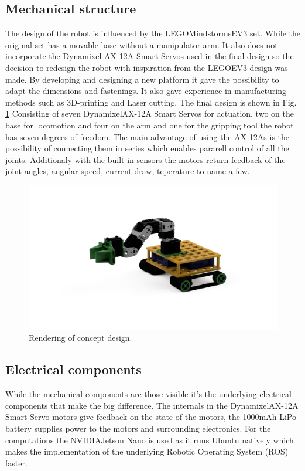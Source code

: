 
\subsection{Mechanical structure}
The design of the robot is influenced by the LEGO\textregistered Mindstorms\textregistered EV3 set. While the original set has a movable base without a manipulator arm. It also does not incorporate the Dynamixel AX-12A Smart Servos used in the final design so the decision to redesign the robot with inspiration from the LEGO\textregistered EV3 design was made. By developing and designing a new platform it gave the possibility to adapt the dimensions and fastenings. It also gave experience in manufacturing methods such as 3D-printing and Laser cutting. The final design is shown in Fig. \ref{fig:concept_rendering}
Consisting of seven Dynamixel\textregistered AX-12A Smart Servos for actuation, two on the base for locomotion and four on the arm and one for the gripping tool the robot has seven degrees of freedom. The main advantage of using the AX-12As is the possibility of connecting them in series which enables pararell control of all the joints. Additionaly with the built in sensors the motors return feedback of the joint angles, angular speed, current draw, teperature to name a few.  

\begin{figure}
    \centering
    \includegraphics[width=0.7\columnwidth]{chapters/img/rendering.png}
    \caption{Rendering of concept design.}
    \label{fig:concept_rendering}
\end{figure}

\subsection{Electrical components}
While the mechanical components are those visible it's the underlying electrical components that make the big difference. The internals in the Dynamixel\textregistered AX-12A Smart Servo motors give feedback on the state of the motors, the 1000mAh LiPo battery supplies power to the motors and surrounding electronics. For the computations the NVIDIA\textregistered Jetson Nano is used as it runs Ubuntu natively which makes the implementation of the underlying Robotic Operating System (ROS) \cite{ros} faster. 


